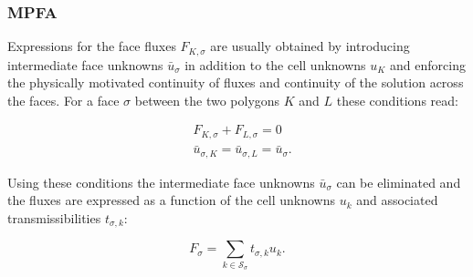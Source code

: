 \subsubsection{MPFA}\label{cc_mpfa}
Expressions for the face fluxes $F_{K, \sigma}$ are usually obtained by introducing intermediate face unknowns $\bar{u}_\sigma$ in addition to the cell unknowns $u_K$ and enforcing the physically motivated continuity of fluxes and continuity of the solution across the faces. For a face $\sigma$ between the two polygons $K$ and $L$ these conditions read:

\begin{equation}
    \begin{aligned}
        &F_{K, \sigma} + F_{L, \sigma} = 0 \\
        &\bar{u}_{\sigma, K} = \bar{u}_{\sigma, L} = \bar{u}_{\sigma}.
        \label{eq:sigmaConditions}
    \end{aligned}
\end{equation}

Using these conditions the intermediate face unknowns $\bar{u}_\sigma$ can be eliminated and the fluxes are expressed as a function of the cell unknowns $u_k$ and associated transmissibilities $t_{\sigma, k}$:

\begin{equation}
    F_{\sigma} = \sum_{k \in \mathcal{S}_\sigma} t_{\sigma, k} u_{k}.
    \label{eq:FVFluxExpression}
\end{equation}

%  

